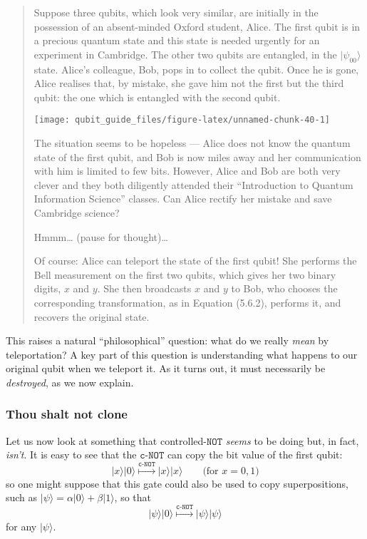 \documentclass[fleqn]{article}
\begin{document}
\begin{quote}
Suppose three qubits, which look very similar, are initially in the possession of an absent-minded Oxford student, Alice.
The first qubit is in a precious quantum state and this state is needed urgently for an experiment in Cambridge.
The other two qubits are entangled, in the \(|\psi_{00}\rangle\) state. Alice's colleague, Bob, pops in to collect the qubit.
Once he is gone, Alice realises that, by mistake, she gave him not the first but the third qubit: the one which is entangled with the second qubit.

\begin{center}\texttt{[image: qubit\_guide\_files/figure-latex/unnamed-chunk-40-1]} \end{center}

The situation seems to be hopeless --- Alice does not know the quantum state of the first qubit, and Bob is now miles away and her communication with him is limited to few bits.
However, Alice and Bob are both very clever and they both diligently attended their ``Introduction to Quantum Information Science'' classes.
Can Alice rectify her mistake and save Cambridge science?

Hmmm\ldots{} (pause for thought)\ldots{}

Of course: Alice can teleport the state of the first qubit!
She performs the Bell measurement on the first two qubits, which gives her two binary digits, \(x\) and \(y\).
She then broadcasts \(x\) and \(y\) to Bob, who chooses the corresponding transformation, as in Equation (5.6.2), performs it, and recovers the original state.
\end{quote}

This raises a natural ``philosophical'' question: what do we really \emph{mean} by teleportation?
A key part of this question is understanding what happens to our original qubit when we teleport it.
As it turns out, it must necessarily be \emph{destroyed}, as we now explain.

\hypertarget{thou-shalt-not-clone}{%
\subsubsection{Thou shalt not clone}\label{thou-shalt-not-clone}}

Let us now look at something that controlled-\(\texttt{NOT}\) \emph{seems} to be doing but, in fact, \emph{isn't}.
It is easy to see that the \(\texttt{c-NOT}\) can copy the bit value of the first qubit:
\[
  |x\rangle|0\rangle \overset{\texttt{c-NOT}}{\longmapsto} |x\rangle|x\rangle
  \qquad\text{(for $x=0,1$)}
\]
so one might suppose that this gate could also be used to copy superpositions, such as \(|\psi\rangle = \alpha|0\rangle+\beta|1\rangle\), so that
\[
  |\psi\rangle|0\rangle \overset{\texttt{c-NOT}}{\longmapsto} |\psi\rangle|\psi\rangle
\]
for any \(|\psi\rangle\).
\end{document}
